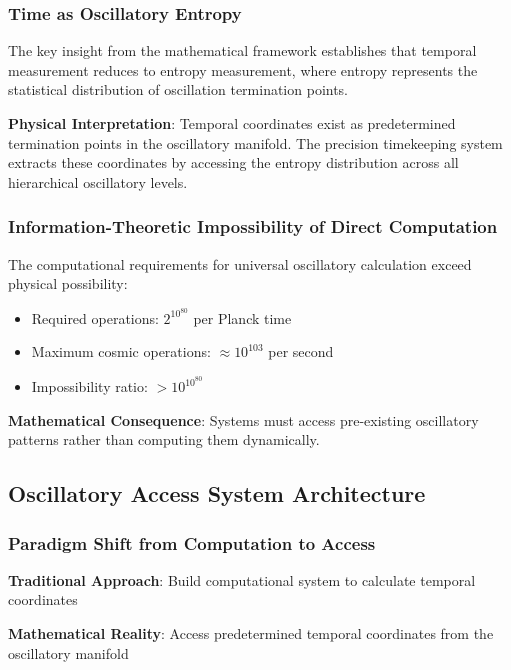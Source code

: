 \documentclass[12pt,a4paper]{article}
\begin{document}
{{{{{{{{{{{{{{\subsubsection{Time as Oscillatory Entropy}

The key insight from the mathematical framework establishes that temporal measurement reduces to entropy measurement, where entropy represents the statistical distribution of oscillation termination points.

\textbf{Physical Interpretation}: Temporal coordinates exist as predetermined termination points in the oscillatory manifold. The precision timekeeping system extracts these coordinates by accessing the entropy distribution across all hierarchical oscillatory levels.

\subsubsection{Information-Theoretic Impossibility of Direct Computation}

The computational requirements for universal oscillatory calculation exceed physical possibility:

\begin{itemize}
\item Required operations: $2^{10^{80}}$ per Planck time
\item Maximum cosmic operations: $\approx 10^{103}$ per second
\item Impossibility ratio: $> 10^{10^{80}}$
\end{itemize}

\textbf{Mathematical Consequence}: Systems must access pre-existing oscillatory patterns rather than computing them dynamically.

\subsection{Oscillatory Access System Architecture}

\subsubsection{Paradigm Shift from Computation to Access}

\textbf{Traditional Approach}: Build computational system to calculate temporal coordinates

\textbf{Mathematical Reality}: Access predetermined temporal coordinates from the oscillatory manifold

}}}}}}}}}}}}}}
\end{document}
